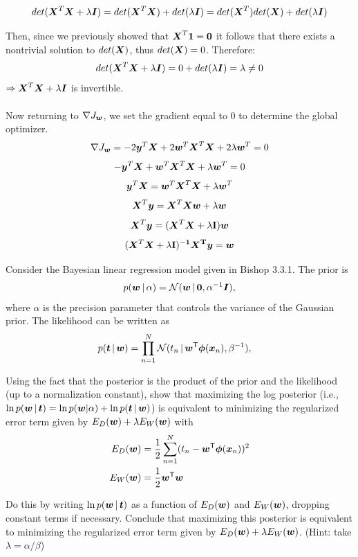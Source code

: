 \documentclass[submit]{harvardml}
\begin{document}
$$det(\boldsymbol{X}^T\boldsymbol{X}+\lambda\boldsymbol{I}) = det(\boldsymbol{X}^T\boldsymbol{X})+det(\lambda\boldsymbol{I}) = det(\boldsymbol{X}^T)det(\boldsymbol{X})+det(\lambda\boldsymbol{I})$$

\noindent
Then, since we previously showed that $\boldsymbol{X}^T\bf 1 = 0$ it follows that there exists a nontrivial solution to $det(\boldsymbol{X})$, thus $det(\boldsymbol{X})=0$. Therefore:
$$det(\boldsymbol{X}^T\boldsymbol{X}+\lambda\boldsymbol{I}) = 0 + det(\lambda\boldsymbol{I}) = \lambda\neq 0 $$ $\Rightarrow \boldsymbol{X}^T\boldsymbol{X}+\lambda\boldsymbol{I}$ is invertible.
\\\\
\noindent
Now returning to $ \nabla J_{\boldsymbol{w}}$, we set the gradient equal to $0$ to determine the global optimizer. $$\nabla J_{\boldsymbol{w}}= -2\boldsymbol{y}^T\boldsymbol{X} + 2\boldsymbol{w}^T\boldsymbol{X}^T\boldsymbol{X} + 2\lambda\boldsymbol{w}^T = 0$$
$$ -\boldsymbol{y}^T\boldsymbol{X} + \boldsymbol{w}^T\boldsymbol{X}^T\boldsymbol{X} + \lambda\boldsymbol{w}^T = 0 $$
$$ \boldsymbol{y}^T\boldsymbol{X} = \boldsymbol{w}^T\boldsymbol{X}^T\boldsymbol{X} + \lambda\boldsymbol{w}^T $$
$$ \boldsymbol{X}^T\boldsymbol{y} = \boldsymbol{X}^T\boldsymbol{X}\boldsymbol{w} + \lambda\boldsymbol{w} $$
$$ \boldsymbol{X}^T\boldsymbol{y} = (\boldsymbol{X}^T\boldsymbol{X} + \lambda\bf I)\boldsymbol{w} $$
$$ (\boldsymbol{X}^T\boldsymbol{X} + \lambda\bf I)^{-1} \boldsymbol{X}^T\boldsymbol{y} = \boldsymbol{w} $$



\newpage
\begin{problem}
Consider the Bayesian linear regression model given in Bishop 3.3.1. The prior is
\begin{align*}
p(\boldsymbol{w} \,|\, \alpha) = \mathcal{N}(\boldsymbol{w} \,|\, \bold0, \alpha^{-1}\boldsymbol{I} ),
\end{align*}
where $\alpha$ is the precision parameter that controls the variance of the Gaussian prior.  The likelihood can be written as
\begin{align*}
p(\boldsymbol{t} \,|\, \boldsymbol{w}) &= \prod_{n=1}^N \mathcal{N}(t_n \,|\, \boldsymbol{w}^{\mathsf{T}} \boldsymbol{\phi}(\boldsymbol{x}_n), \beta^{-1}),
\end{align*}

Using the fact that the posterior is the product of the prior and the likelihood (up to a normalization constant), show that maximizing the log posterior (i.e., $\ln p(\boldsymbol{w} \,|\, \boldsymbol{t})= \ln p(\boldsymbol{w} | \alpha) + \ln p(\boldsymbol{t} \,|\, \boldsymbol{w})$) is equivalent to minimizing the regularized error term given by ${E_D(\boldsymbol{w}) + \lambda E_W(\boldsymbol{w})}$ with 
\begin{align*}
E_D(\boldsymbol{w}) &= \frac{1}{2}\sum_{n = 1}^N (t_n - \boldsymbol{w}^{\mathsf{T}} \boldsymbol{\phi}(\boldsymbol{x}_n))^2 \\
E_W(\boldsymbol{w}) &= \frac{1}{2}\boldsymbol{w}^{\mathsf{T}} \boldsymbol{w}
\end{align*} 

Do this by writing $\ln p(\boldsymbol{w} \,|\, \boldsymbol{t})$ as a function of $E_D(\boldsymbol{w})$ and $E_W(\boldsymbol{w})$, dropping constant terms if necessary.  Conclude that maximizing this posterior is equivalent to minimizing the regularized error term given by $E_D(\boldsymbol{w}) + \lambda E_W(\boldsymbol{w})$. (Hint: take $\lambda = \alpha/\beta$)
\end{problem}
\end{document}

